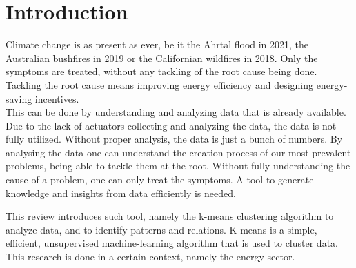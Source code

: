 \section{Introduction}
\label{cha:introduction}


Climate change is as present as ever, be it the Ahrtal flood in 2021, the Australian bushfires in 2019 or the Californian wildfires in 2018.
Only the symptoms are treated, without any tackling of the root cause being done.
Tackling the root cause means improving energy efficiency and designing energy-saving incentives.\\
This can be done by understanding and analyzing data that is already available.
Due to the lack of actuators collecting and analyzing the data, the data is not fully utilized.
Without proper analysis, the data is just a bunch of numbers.
By analysing the data one can understand the creation process of our most prevalent problems, being able to tackle them at the root.
Without fully understanding the cause of a problem, one can only treat the symptoms.
A tool to generate knowledge and insights from data efficiently is needed.


This review introduces such tool, namely the k-means clustering algorithm to analyze data, and to identify patterns and relations.
K-means is a simple, efficient, unsupervised machine-learning algorithm that is used to cluster data.
This research is done in a certain context, namely the energy sector.

